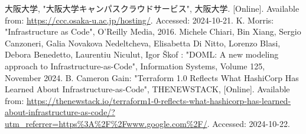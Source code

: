 \documentclass[11pt]{ujarticle}\sloppy
\begin{document}
\begin{thebibliography}{99}
	大阪大学, "大阪大学キャンパスクラウドサービス", 大阪大学. [Online]. Available from: \url{https://ccc.osaka-u.ac.jp/hosting/}. Accessed: 2024-10-21.
	K. Morris: "Infrastructure as Code", O'Reilly Media, 2016.
	Michele Chiari, Bin Xiang, Sergio Canzoneri, Galia Novakova Nedeltcheva, Elisabetta Di Nitto, Lorenzo Blasi, Debora Benedetto, Laurentiu Niculut, Igor Škof : "DOML: A new modeling approach to Infrastructure-as-Code", Information Systems, Volume 125, November 2024. 
	B. Cameron Gain: "Terraform 1.0 Reflects What HashiCorp Has Learned About Infrastructure-as-Code", THENEWSTACK, [Online]. Available from: \url{https://thenewstack.io/terraform1-0-reflects-what-hashicorp-has-learned-about-infrastructure-as-code/?utm_referrer=https%3A%2F%2Fwww.google.com%2F/}. Accessed: 2024-10-22.
\end{thebibliography}
\end{document}
